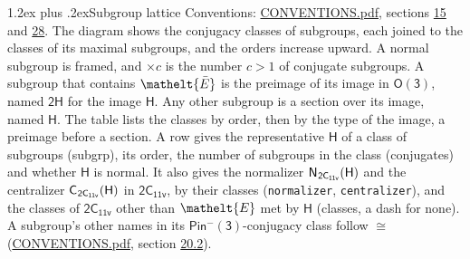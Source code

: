 \documentclass[10pt,a4paper]{article}
\makeatletter
\renewcommand\section{\@startsection{section}{1}{\z@}{-3ex plus -1ex minus -.2ex}%
  {1.2ex plus .2ex}{\normalfont\large\sffamily\bfseries\color{parttitle}}}
\numberwithin{equation}{section}
\newcommand{\eltfont}[1]{{\let\sigma\eltsigma\mathelt{#1}}}
\newcommand{\grp}[1]{\mathsf{#1}}
\newcommand{\cls}[1]{\eltfont{#1}}
\newcommand{\elt}[1]{\eltfont{#1}}
\newcommand{\samecls}{\cong}
\newcommand{\nconj}[1]{{\scriptsize$\times#1$}}
\newcommand{\barred}[1]{\bar{#1}}
\newcommand{\hairsp}{\mkern1mu}
\makeatother
\begin{document}
\section{Subgroup lattice}\label{s:subgroups}
Conventions: \href{../../CONVENTIONS.pdf}{CONVENTIONS.pdf}, sections \href{../../../rotation/CONVENTIONS.pdf\#conv.15}{15} and \href{../../CONVENTIONS.pdf\#conv.28}{28}.
The diagram shows the conjugacy classes of subgroups, each joined to the classes of its maximal subgroups, and the orders increase upward. A normal subgroup is framed, and ${\times}c$ is the number $c > 1$ of conjugate subgroups. \label{n:group.H}A subgroup that contains $\elt{\barred{E}}$ is the preimage of its image in $\grp{O(3)}$, named $\grp{2H}$ for the image $\grp{H}$. Any other subgroup is a section over its image, named $\grp{H}$. The table lists the classes by order, then by the type of the image, a preimage before a section. \label{n:head.subgroup}\label{n:head.order}\label{n:head.conjugates}\label{n:head.normal}A row gives the representative $\grp{H}$ of a class of subgroups (subgrp), its order, the number of subgroups in the class (conjugates) and whether $\grp{H}$ is normal. \label{n:group.normalizer}\label{n:group.centralizer}\label{n:head.classes}It also gives the normalizer $\grp{N}_{\hairsp \grp{2C_{11v}}}(\grp{H})$ and the centralizer $\grp{C}_{\hairsp \grp{2C_{11v}}}(\grp{H})$ in $\grp{2C_{11v}}$, by their classes (\texttt{normalizer}, \texttt{centralizer}), and the classes of $\grp{2C_{11v}}$ other than $\cls{E}$ met by $\grp{H}$ (classes, a dash for none). A subgroup's other names in its \href{Pinminus3.pdf}{$\grp{Pin^{-}(3)}$}-conjugacy class follow $\samecls$ (\href{../../CONVENTIONS.pdf}{CONVENTIONS.pdf}, section \href{../../CONVENTIONS.pdf\#conv.20.2}{20.2}).
\begin{center}
\end{center}
\end{document}
